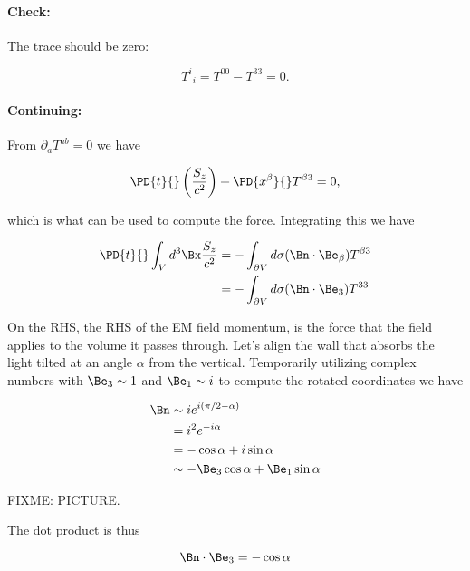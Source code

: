 \paragraph{Check:} The trace should be zero:

\begin{equation}\label{eqn:relativisticElectrodynamicsPS6P1:580}
{T^i}_i = T^{0 0} - T^{3 3} = 0.
\end{equation}

\paragraph{Continuing:}

From $\partial_a T^{a b} = 0$ we have

\begin{equation}\label{eqn:relativisticElectrodynamicsPS6P1:600}
\PD{t}{} \left( \frac{S_z}{c^2} \right) + \PD{x^\beta}{} T^{\beta 3} = 0,
\end{equation}

which is what can be used to compute the force.  Integrating this we have

\begin{align*}
\PD{t}{} \int_V d^3 \Bx \frac{S_z}{c^2} 
&= - \int_{\partial V} d\sigma (\Bn \cdot \Be_\beta) T^{\beta 3} \\
&= - \int_{\partial V} d\sigma (\Bn \cdot \Be_3) T^{3 3} 
\end{align*}

On the RHS, the RHS of the EM field momentum, is the force that the field applies to the volume it passes through.  Let's align the wall that absorbs the light tilted at an angle $\alpha$ from the vertical.  Temporarily utilizing complex numbers with $\Be_3 \sim 1$ and $\Be_1 \sim i$ to compute the rotated coordinates we have

\begin{align*}
\Bn 
&\sim i e^{i (\pi/2 - \alpha)} \\
&= i^2 e^{-i \alpha} \\
&= -\cos\alpha + i \sin\alpha \\
&\sim
-\Be_3 \cos\alpha + \Be_1 \sin\alpha
\end{align*}

FIXME: PICTURE.

The dot product is thus

\begin{equation}\label{eqn:relativisticElectrodynamicsPS6P1:620}
\Bn \cdot \Be_3 = -\cos\alpha
\end{equation}

